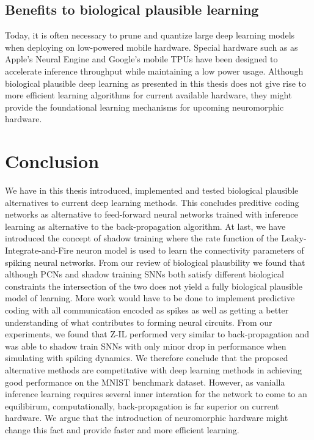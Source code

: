 \documentclass[a4paper,11pt]{article} %
\begin{document}
\subsection{Benefits to biological plausible learning}

Today, it is often necessary to prune and quantize large deep learning models when deploying on low-powered mobile hardware. Special hardware such as as Apple's Neural Engine and Google's mobile TPUs have been designed to accelerate inference throughput while maintaining a low power usage. Although biological plausible deep learning as presented in this thesis does not give rise to more efficient learning algorithms for current available hardware, they might provide the foundational learning mechanisms for upcoming neuromorphic hardware. 

\newpage

\section{Conclusion}
We have in this thesis introduced, implemented and tested biological plausible alternatives to current deep learning methods. This concludes preditive coding networks as alternative to feed-forward neural networks trained with inference learning as alternative to the back-propagation algorithm. At last, we have introduced the concept of shadow training where the rate function of the Leaky-Integrate-and-Fire neuron model is used to learn the connectivity parameters of spiking neural networks. From our review of biological plausbility we found that although PCNs and shadow training SNNs both satisfy different biological constraints the intersection of the two does not yield a fully biological plausible model of learning. More work would have to be done to implement predictive coding with all communication encoded as spikes as well as getting a better understanding of what contributes to forming neural circuits. From our experiments, we found that Z-IL performed very similar to back-propagation and was able to shadow train SNNs with only minor drop in performance when simulating with spiking dynamics. We therefore conclude that the proposed alternative methods are competitative with deep learning methods in achieving good performance on the MNIST benchmark dataset. However, as vanialla inference learning requires several inner interation for the network to come to an equilibirum, computationally, back-propagation is far superior on current hardware. We argue that the introduction of neuromorphic hardware might change this fact and provide faster and more efficient learning. 
\end{document}
